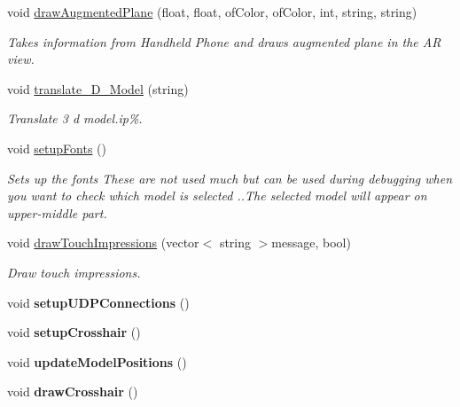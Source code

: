 \begin{DoxyCompactItemize}
\item 
void \hyperlink{classtest_app_a34646de458b0af33bc02457c9b8583df}{draw\-Augmented\-Plane} (float, float, of\-Color, of\-Color, int, string, string)
\begin{DoxyCompactList}\small\item\em Takes information from Handheld Phone and draws augmented plane in the A\-R view. \end{DoxyCompactList}\item 
void \hyperlink{classtest_app_ae9ee24f0c2bec5965519deef1a14da16}{translate\-\_\-D\-\_\-\-Model} (string)
\begin{DoxyCompactList}\small\item\em Translate 3 d model.ip\%. \end{DoxyCompactList}\item 
void \hyperlink{group___g_u_i_ga210397e42daad5b2ded2b80598905827}{setup\-Fonts} ()
\begin{DoxyCompactList}\small\item\em Sets up the fonts These are not used much but can be used during debugging when you want to check which model is selected ..The selected model will appear on upper-\/middle part. \end{DoxyCompactList}\item 
void \hyperlink{group___g_u_i_ga12fd724a9073e84f1367d01f97d222d8}{draw\-Touch\-Impressions} (vector$<$ string $>$message, bool)
\begin{DoxyCompactList}\small\item\em Draw touch impressions. \end{DoxyCompactList}\item 
\hypertarget{classtest_app_a0d5c58a4c1ebdb291618b34d5237f77b}{void {\bfseries setup\-U\-D\-P\-Connections} ()}\label{classtest_app_a0d5c58a4c1ebdb291618b34d5237f77b}

\item 
\hypertarget{classtest_app_aae96728967b563fab5b52350915829b7}{void {\bfseries setup\-Crosshair} ()}\label{classtest_app_aae96728967b563fab5b52350915829b7}

\item 
\hypertarget{classtest_app_a4f0adc57489b13878194958d0f2da032}{void {\bfseries update\-Model\-Positions} ()}\label{classtest_app_a4f0adc57489b13878194958d0f2da032}

\item 
\hypertarget{classtest_app_a9d57148d51d852b0fe1051ee150f0fc0}{void {\bfseries draw\-Crosshair} ()}\label{classtest_app_a9d57148d51d852b0fe1051ee150f0fc0}


\end{DoxyCompactItemize}
